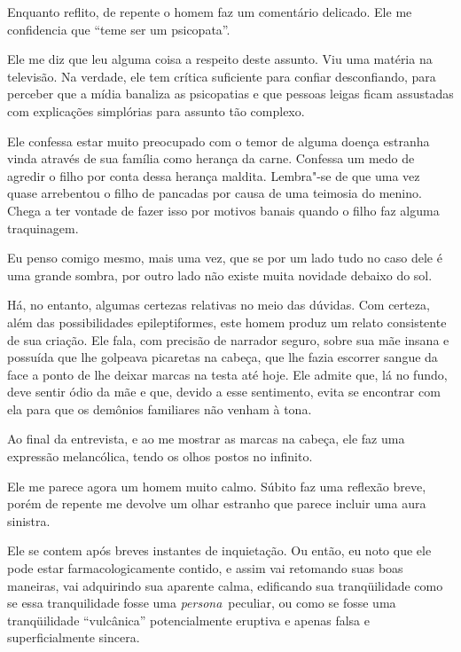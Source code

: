 Enquanto reflito, de repente o homem faz um comentário delicado. Ele me
confidencia que ``teme ser um psicopata''.

Ele me diz que leu alguma coisa a respeito deste assunto. Viu uma
matéria na televisão. Na verdade, ele tem crítica suficiente para
confiar desconfiando, para perceber que a mídia banaliza as psicopatias
e que pessoas leigas ficam assustadas com explicações simplórias para
assunto tão complexo.

Ele confessa estar muito preocupado com o temor de alguma doença
estranha vinda através de sua família como herança da carne. Confessa um
medo de agredir o filho por conta dessa herança maldita. Lembra"-se de
que uma vez quase arrebentou o filho de pancadas por causa de uma
teimosia do menino. Chega a ter vontade de fazer isso por motivos banais
quando o filho faz alguma traquinagem.

\asterisc{}

Eu penso comigo mesmo, mais uma vez, que se por um lado tudo no caso
dele é uma grande sombra, por outro lado não existe muita novidade
debaixo do sol.

Há, no entanto, algumas certezas relativas no meio das dúvidas. Com
certeza, além das possibilidades epileptiformes, este homem produz um
relato consistente de sua criação. Ele fala, com precisão de narrador
seguro, sobre sua mãe insana e possuída que lhe golpeava picaretas na
cabeça, que lhe fazia escorrer sangue da face a ponto de lhe deixar
marcas na testa até hoje. Ele admite que, lá no fundo, deve sentir ódio
da mãe e que, devido a esse sentimento, evita se encontrar com ela para
que os demônios familiares não venham à tona.

Ao final da entrevista, e ao me mostrar as marcas na cabeça, ele faz uma
expressão melancólica, tendo os olhos postos no infinito.

\asterisc{}

Ele me parece agora um homem muito calmo. Súbito faz uma reflexão breve,
porém de repente me devolve um olhar estranho que parece incluir uma
aura sinistra.

Ele se contem após breves instantes de inquietação. Ou então, eu noto
que ele pode estar farmacologicamente contido, e assim vai retomando
suas boas maneiras, vai adquirindo sua aparente calma, edificando sua
tranqüilidade como se essa tranquilidade fosse uma
\emph{persona}~peculiar, ou como se fosse uma tranqüilidade
``vulcânica'' potencialmente eruptiva e apenas falsa e superficialmente
sincera.~

